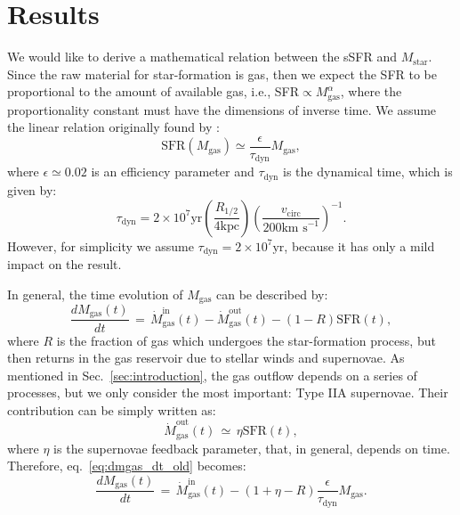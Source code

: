 \documentclass[fleqn,usenatbib]{mnras}
\begin{document}
\section{Results}\label{sec:results}
We would like to derive a mathematical relation between the sSFR and $M_\text{star}$. Since the raw material for star-formation is gas, then we expect the SFR to be proportional to the amount of available gas, i.e., SFR$\propto M_\text{gas}^\alpha$, where the proportionality constant must have the dimensions of inverse time. We assume the linear relation originally found by \citet{Kennicutt_1998}:
\begin{equation}
    \text{SFR}\left(M_\text{gas}\right) \simeq \dfrac{\epsilon}{\tau_\text{dyn}} M_\text{gas},
	\label{eq:SFR_vs_gasmas}
\end{equation}
where $\epsilon \simeq 0.02$ is an efficiency parameter and $\tau_\text{dyn}$ is the dynamical time, which is given by:
\begin{equation}
    \tau_\text{dyn} = 2 \times 10^7 \text{yr} \left(\dfrac{R_{1\slash2}}{4\text{kpc}}\right) \left(\dfrac{v_\text{circ}}{200\text{km s}^{-1}}\right)^{-1}.
	\label{eq:t_dynamical}
\end{equation}
However, for simplicity we assume $\tau_\text{dyn} = 2 \times 10^7 \text{yr}$, because it has only a mild impact on the result.


In general, the time evolution of $M_\text{gas}$ can be described by:
\begin{equation}
    \dfrac{dM_\text{gas}(t)}{dt} \, = \, \dot{M}_\text{gas}^\text{in}(t) - \dot{M}_\text{gas}^\text{out}(t) - \left(1-R\right)\text{SFR}(t),
	\label{eq:dmgas_dt_old}
\end{equation}
where $R$ is the fraction of gas which undergoes the star-formation process, but then returns in the gas reservoir due to stellar winds and supernovae.
As mentioned in Sec.~\ref{sec:introduction}, the gas outflow depends on a series of processes, but we only consider the most important: Type IIA supernovae. Their contribution can be simply written as:
\begin{equation}
    \dot{M}_\text{gas}^\text{out}(t) \, \simeq \, \eta\text{SFR}(t),
	\label{eq:mgas_outflow}
\end{equation}
where $\eta$ is the supernovae feedback parameter, that, in general, depends on time. Therefore, eq.~\ref{eq:dmgas_dt_old} becomes:
\begin{equation}
    \dfrac{dM_\text{gas}(t)}{dt} \, = \, \dot{M}_\text{gas}^\text{in}(t) - \left(1+\eta-R\right) \dfrac{\epsilon}{\tau_\text{dyn}} M_\text{gas}.
	\label{eq:dmgas_dt}
\end{equation}
\end{document}
